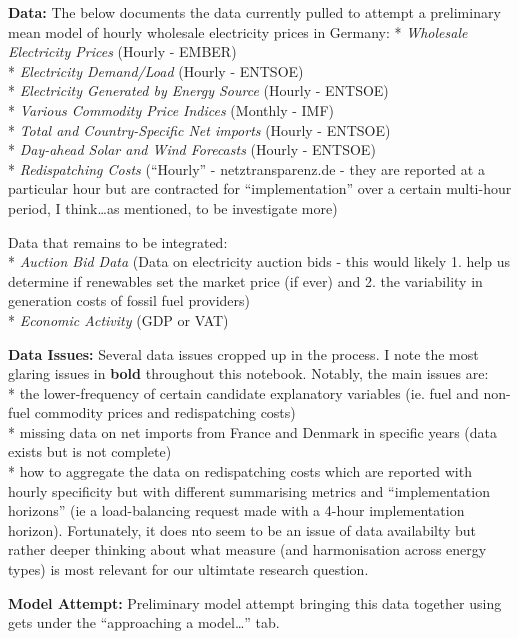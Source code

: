 \documentclass[
]{article}
\begin{document}
\textbf{Data:} The below documents the data currently pulled to attempt
a preliminary mean model of hourly wholesale electricity prices in
Germany: * \emph{Wholesale Electricity Prices} (Hourly - EMBER)\\
* \emph{Electricity Demand/Load} (Hourly - ENTSOE)\\
* \emph{Electricity Generated by Energy Source} (Hourly - ENTSOE)\\
* \emph{Various Commodity Price Indices} (Monthly - IMF)\\
* \emph{Total and Country-Specific Net imports} (Hourly - ENTSOE)\\
* \emph{Day-ahead Solar and Wind Forecasts} (Hourly - ENTSOE)\\
* \emph{Redispatching Costs} (``Hourly'' - netztransparenz.de - they are
reported at a particular hour but are contracted for ``implementation''
over a certain multi-hour period, I think\ldots as mentioned, to be
investigate more)

Data that remains to be integrated:\\
* \emph{Auction Bid Data} (Data on electricity auction bids - this would
likely 1. help us determine if renewables set the market price (if ever)
and 2. the variability in generation costs of fossil fuel providers)\\
* \emph{Economic Activity} (GDP or VAT)

\textbf{Data Issues:} Several data issues cropped up in the process. I
note the most glaring issues in \textbf{bold} throughout this notebook.
Notably, the main issues are:\\
* the lower-frequency of certain candidate explanatory variables (ie.
fuel and non-fuel commodity prices and redispatching costs)\\
* missing data on net imports from France and Denmark in specific years
(data exists but is not complete)\\
* how to aggregate the data on redispatching costs which are reported
with hourly specificity but with different summarising metrics and
``implementation horizons'' (ie a load-balancing request made with a
4-hour implementation horizon). Fortunately, it does nto seem to be an
issue of data availabilty but rather deeper thinking about what measure
(and harmonisation across energy types) is most relevant for our
ultimtate research question.

\textbf{Model Attempt:} Preliminary model attempt bringing this data
together using gets under the ``approaching a model\ldots{}'' tab.
\end{document}
